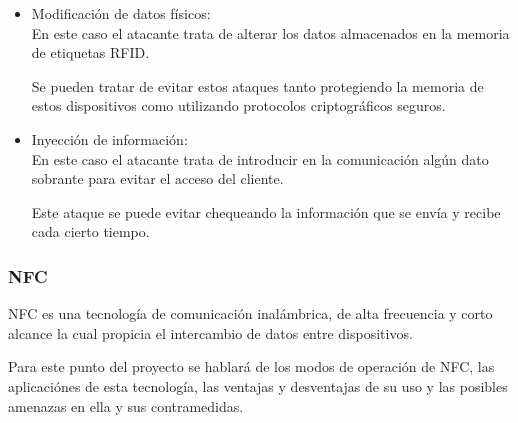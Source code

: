 \documentclass[12pt,a4paper,onecolumn,oneside]{report}
\newcounter{subsubsubsection}[subsubsection]
\begin{document}
\begin{itemize}
\item Modificación de datos físicos:\\
En este caso el atacante trata de alterar los datos almacenados en la memoria de etiquetas RFID. 

Se pueden tratar de evitar estos ataques tanto protegiendo la memoria de estos dispositivos como utilizando protocolos criptográficos seguros. 

\item Inyección de información:\\
En este caso el atacante trata de introducir en la comunicación algún dato sobrante para evitar el acceso del cliente. 

Este ataque se puede evitar chequeando la información que se envía y recibe cada cierto tiempo.


\end{itemize}




\subsubsection{NFC}

NFC es una tecnología de comunicación inalámbrica, de alta frecuencia y corto alcance la cual propicia el intercambio de datos entre dispositivos.

Para este punto del proyecto se hablará de los modos de operación de NFC, las aplicaciónes de esta tecnología, las ventajas y desventajas de su uso y las posibles amenazas en ella y sus contramedidas.

\end{document}
